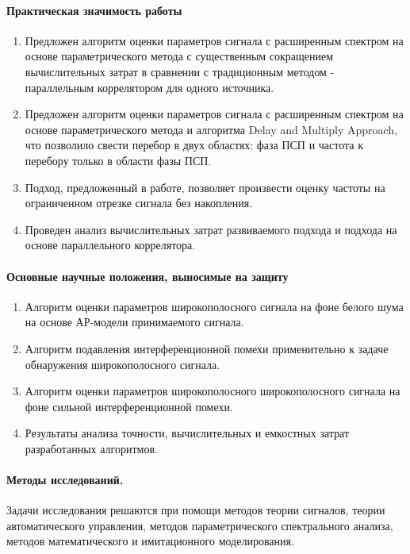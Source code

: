 \paragraph{Практическая значимость работы}
\begin{enumerate}
	\item {Предложен алгоритм оценки параметров сигнала с расширенным спектром на основе параметрического метода с существенным
		сокращением вычислительных затрат в сравнении с традиционным методом - параллельным коррелятором для одного источника.}
	\item {Предложен алгоритм оценки параметров сигнала с расширенным спектром на основе параметрического метода и алгоритма
		Delay and Multiply Approach,
		что позволило свести перебор в двух областях: фаза ПСП и частота к перебору только в области фазы ПСП.}
	\item {Подход, предложенный в работе, позволяет произвести оценку частоты на ограниченном отрезке сигнала без накопления.}
	\item {Проведен анализ вычислительных затрат развиваемого подхода и подхода на основе параллельного коррелятора.}
\end{enumerate}

\paragraph{Основные научные положения, выносимые на защиту}
\begin{enumerate}
	\item {Алгоритм оценки параметров широкополосного сигнала на фоне белого шума на основе АР-модели принимаемого сигнала.}
	\item {Алгоритм подавления интерференционной помехи применительно к задаче обнаружения широкополосного сигнала.}
	\item {Алгоритм оценки параметров широкополосного широкополосного сигнала на фоне сильной интерференционной помехи.}
	\item {Результаты анализа точности, вычислительных и емкостных затрат разработанных алгоритмов.}
\end{enumerate}

\paragraph{Методы исследований.} Задачи исследования решаются при помощи методов теории сигналов, теории автоматического управления,
методов параметрического спектрального анализа, методов математического и имитационного моделирования.

